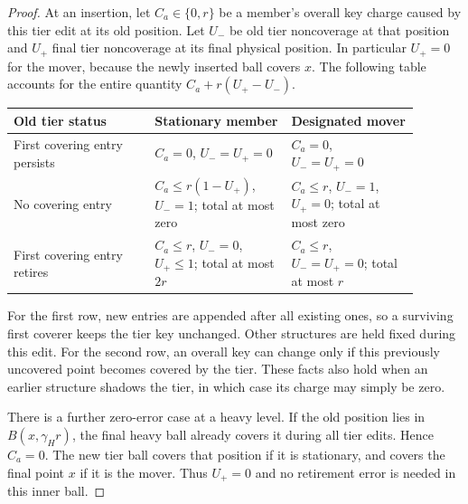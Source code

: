 \begin{proof}
At an insertion, let \(C_a\in\{0,r\}\) be a member's overall key
charge caused by this tier edit at its old position.  Let \(U_-\) be
old tier noncoverage at that position and \(U_+\) final tier
noncoverage at its final physical position.  In particular \(U_+=0\)
for the mover, because the newly inserted ball covers \(x\).  The
following table accounts for the entire quantity
\(C_a+r(U_+-U_-)\).
\begin{center}
\small
\begin{tabular}{p{0.31\linewidth}p{0.30\linewidth}p{0.28\linewidth}}
\toprule
Old tier status & Stationary member & Designated mover \\
\midrule
First covering entry persists &
\(C_a=0\), \(U_-=U_+=0\) &
\(C_a=0\), \(U_-=U_+=0\) \\
\addlinespace
No covering entry &
\(C_a\le r(1-U_+)\), \(U_-=1\); total at most zero &
\(C_a\le r\), \(U_-=1\), \(U_+=0\); total at most zero \\
\addlinespace
First covering entry retires &
\(C_a\le r\), \(U_-=0\), \(U_+\le1\); total at most \(2r\) &
\(C_a\le r\), \(U_-=U_+=0\); total at most \(r\) \\
\bottomrule
\end{tabular}
\end{center}
For the first row, new entries are appended after all existing ones, so
a surviving first coverer keeps the tier key unchanged.  Other structures
are held fixed during this edit.  For the second row, an overall key can
change only if this previously uncovered point becomes covered by the
tier.  These facts also hold when an earlier structure shadows the tier,
in which case its charge may simply be zero.

There is a further zero-error case at a heavy level.  If the old position
lies in \(B(x,\gamma_Hr)\), the final heavy ball already covers it
during all tier edits.  Hence \(C_a=0\).  The new tier ball covers
that position if it is stationary, and covers the final point \(x\)
if it is the mover.  Thus \(U_+=0\) and no retirement error is needed
in this inner ball.


\end{proof}
